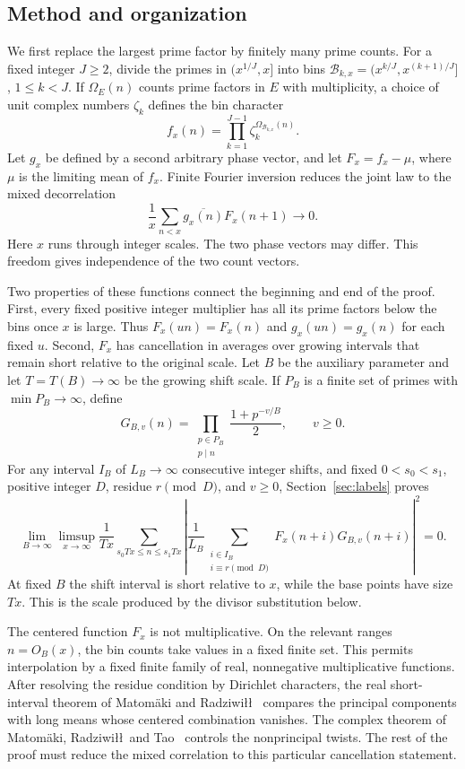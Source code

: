 \subsection{Method and organization}

We first replace the largest prime factor by finitely many prime counts.
For a fixed integer $J\ge2$, divide the primes in $(x^{1/J},x]$ into
bins $\mathcal B_{k,x}=(x^{k/J},x^{(k+1)/J}]$, $1\le k<J$.  If
$\Omega_E(n)$ counts prime factors in $E$ with multiplicity, a choice of
unit complex numbers $\zeta_k$ defines the bin character
\[
 f_x(n)=\prod_{k=1}^{J-1}\zeta_k^{\Omega_{\mathcal B_{k,x}}(n)}.
\]
Let $g_x$ be defined by a second arbitrary phase vector, and
let $F_x=f_x-\mu$, where $\mu$ is the limiting mean of $f_x$.  Finite
Fourier inversion reduces the joint law to the mixed decorrelation
\[
 \frac1x\sum_{n<x}\overline{g_x(n)}F_x(n+1)\longrightarrow0.
\]
Here $x$ runs through integer scales.
The two phase vectors may differ.  This freedom gives independence of
the two count vectors.

Two properties of these functions connect the beginning and end of the
proof.  First, every fixed positive integer multiplier has all its prime factors
below the bins once $x$ is large.  Thus $F_x(un)=F_x(n)$ and
$g_x(un)=g_x(n)$ for each fixed $u$.  Second, $F_x$ has cancellation in
averages over growing intervals that remain short relative to the original
scale.  Let $B$ be the auxiliary parameter and let $T=T(B)\to\infty$ be
the growing shift scale.  If $P_B$ is a finite set of primes with
$\min P_B\to\infty$, define
\[
 G_{B,v}(n)=\prod_{\substack{p\in P_B\\p\mid n}}
                 \frac{1+p^{-v/B}}2,\qquad v\ge0.
\]
For any interval $I_B$ of $L_B\to\infty$ consecutive integer shifts,
and fixed $0<s_0<s_1$, positive integer $D$, residue $r\pmod D$, and $v\ge0$,
Section~\ref{sec:labels} proves
\[
 \lim_{B\to\infty}\limsup_{x\to\infty}
 \frac1{Tx}\sum_{s_0Tx\le n\le s_1Tx}
 \left|\frac1{L_B}
   \sum_{\substack{i\in I_B\\i\equiv r\pmod D}}
     F_x(n+i)G_{B,v}(n+i)\right|^2=0.
\]
At fixed $B$ the shift interval is short relative to $x$, while the base
points have size $Tx$.  This is the scale produced by the divisor
substitution below.

The centered function $F_x$ is not multiplicative.  On the relevant ranges
$n=O_B(x)$, the bin counts take values in a fixed finite set.  This permits
interpolation by a fixed finite family of real,
nonnegative multiplicative functions.  After resolving the residue
condition by Dirichlet characters, the real short-interval theorem of
Matom\"aki and Radziwi\l\l~\cite[Theorem~1]{MatomakiRadziwill2016} compares
the principal components with long means whose centered combination
vanishes.  The complex theorem of Matom\"aki, Radziwi\l\l\ and
Tao~\cite[Theorem~A.1, corrected version]{MatomakiRadziwillTao2015}
controls the nonprincipal twists.  The rest of the proof must reduce
the mixed correlation to this particular cancellation statement.

